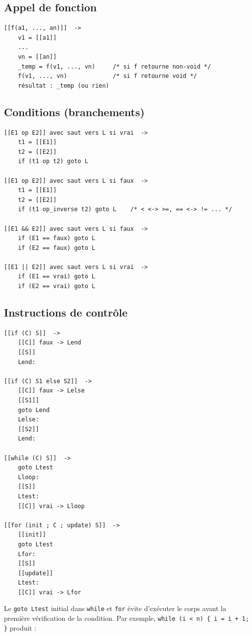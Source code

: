 \documentclass[12pt,a4paper]{article}
\begin{document}
\subsection{Appel de fonction}

\begin{lstlisting}
[[f(a1, ..., an)]]  ->
    v1 = [[a1]]
    ...
    vn = [[an]]
    _temp = f(v1, ..., vn)     /* si f retourne non-void */
    f(v1, ..., vn)             /* si f retourne void */
    résultat : _temp (ou rien)
\end{lstlisting}

\subsection{Conditions (branchements)}

\begin{lstlisting}
[[E1 op E2]] avec saut vers L si vrai  ->
    t1 = [[E1]]
    t2 = [[E2]]
    if (t1 op t2) goto L

[[E1 op E2]] avec saut vers L si faux  ->
    t1 = [[E1]]
    t2 = [[E2]]
    if (t1 op_inverse t2) goto L    /* < <-> >=, == <-> != ... */

[[E1 && E2]] avec saut vers L si faux  ->
    if (E1 == faux) goto L
    if (E2 == faux) goto L

[[E1 || E2]] avec saut vers L si vrai  ->
    if (E1 == vrai) goto L
    if (E2 == vrai) goto L
\end{lstlisting}

\subsection{Instructions de contrôle}

\begin{lstlisting}
[[if (C) S]]  ->
    [[C]] faux -> Lend
    [[S]]
    Lend:

[[if (C) S1 else S2]]  ->
    [[C]] faux -> Lelse
    [[S1]]
    goto Lend
    Lelse:
    [[S2]]
    Lend:

[[while (C) S]]  ->
    goto Ltest
    Lloop:
    [[S]]
    Ltest:
    [[C]] vrai -> Lloop

[[for (init ; C ; update) S]]  ->
    [[init]]
    goto Ltest
    Lfor:
    [[S]]
    [[update]]
    Ltest:
    [[C]] vrai -> Lfor
\end{lstlisting}

Le \texttt{goto Ltest} initial dans \texttt{while} et \texttt{for} évite d'exécuter le corps avant la première vérification de la condition. Par exemple, \texttt{while (i < n) \{ i = i + 1; \}} produit :
\end{document}
